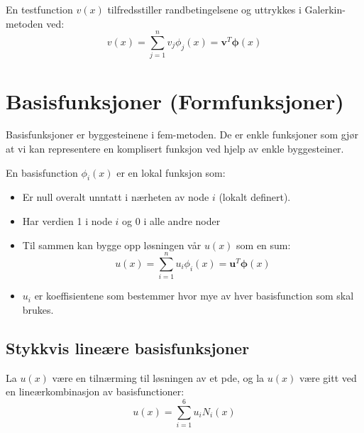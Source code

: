 En \gls{testfunction} $v(x)$ tilfredsstiller randbetingelsene og uttrykkes i Galerkin-metoden ved:
\[
	v(x) = \sum_{j=1}^n v_j \phi_j(x) = \symbf{v}^T \symbf{\phi}(x)
\]

\section{Basisfunksjoner (Formfunksjoner)}

Basisfunksjoner er byggesteinene i \gls{fem}-metoden.
De er enkle funksjoner som gjør at vi kan representere en komplisert funksjon ved hjelp av enkle byggesteiner.

En \gls{basisfunction} \(\phi_i(x)\) er en lokal funksjon som:
\begin{itemize}
	\item Er null overalt unntatt i nærheten av node \(i\) (lokalt definert).
	\item Har verdien 1 i node \(i\) og 0 i alle andre noder
	\item Til sammen kan bygge opp løsningen vår \(u(x)\) som en sum:
	      \[
		      u(x) = \sum_{i=1}^n u_i \phi_i(x) = \symbf{u}^T \symbf{\phi}(x)
	      \]
	\item \(u_i\) er koeffisientene som bestemmer hvor mye av hver \gls{basisfunction} som skal brukes.
\end{itemize}


\subsection{Stykkvis lineære basisfunksjoner}

La \(u(x)\) være en tilnærming til løsningen av et \gls{pde}, og la \(u(x)\) være gitt ved en lineærkombinasjon av \gls{basisfunction}er:
\[
	u(x) = \sum_{i=1}^6 u_i N_i(x)
\]

